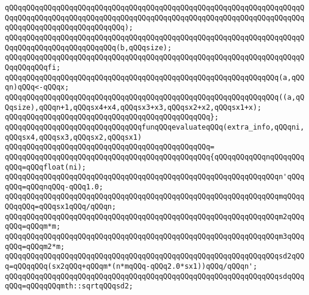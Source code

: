 \verb|qQQqqQQqqQQqqQQqqQQqqQQqqQQqqQQqqQQqqQQqqQQqqQQqqQQqqQQqqQQqqQQqqQQqqQQqqQQqqQQqqQQqqQQqqQQqqQQqqQQqqQQqqQQqqQQqqQQqqQQqqQQqqQQqqQQqqQQqqQQqqQQqqQQqqQQqqQQqqQQqqQQqqQQq);|\newline
\newline
\verb|qQQqqQQqqQQqqQQqqQQqqQQqqQQqqQQqqQQqqQQqqQQqqQQqqQQqqQQqqQQqqQQqqQQqqQQqqQQqqQQqqQQqqQQqqQQqqQQq(b,qQQqsize);|\newline
\verb|qQQqqQQqqQQqqQQqqQQqqQQqqQQqqQQqqQQqqQQqqQQqqQQqqQQqqQQqqQQqqQQqqQQqqQQqqQQqqQQqfi;|\newline
\newline
\verb|qQQqqQQqqQQqqQQqqQQqqQQqqQQqqQQqqQQqqQQqqQQqqQQqqQQqqQQqqQQqqQQq(a,qQQqn)qQQq<-qQQqx;|\newline
\newline
\verb|qQQqqQQqqQQqqQQqqQQqqQQqqQQqqQQqqQQqqQQqqQQqqQQqqQQqqQQqqQQqqQQq((a,qQQqsize),qQQqn+1,qQQqsx4+x4,qQQqsx3+x3,qQQqsx2+x2,qQQqsx1+x);|\newline
\verb|qQQqqQQqqQQqqQQqqQQqqQQqqQQqqQQqqQQqqQQqqQQqqQQq};|\newline
\newline
\verb|qQQqqQQqqQQqqQQqqQQqqQQqqQQqqQQqfunqQQqevaluateqQQq(extra_info,qQQqni,qQQqsx4,qQQqsx3,qQQqsx2,qQQqsx1)|\newline
\verb|qQQqqQQqqQQqqQQqqQQqqQQqqQQqqQQqqQQqqQQqqQQqqQQq=|\newline
\verb|qQQqqQQqqQQqqQQqqQQqqQQqqQQqqQQqqQQqqQQqqQQqqQQq{qQQqqQQqqQQqnqQQqqQQqqQQq=qQQqfloat(ni);|\newline
\verb|qQQqqQQqqQQqqQQqqQQqqQQqqQQqqQQqqQQqqQQqqQQqqQQqqQQqqQQqqQQqqQQqn'qQQqqQQq=qQQqnqQQq-qQQq1.0;|\newline
\newline
\verb|qQQqqQQqqQQqqQQqqQQqqQQqqQQqqQQqqQQqqQQqqQQqqQQqqQQqqQQqqQQqqQQqmqQQqqQQqqQQq=qQQqsx1qQQq/qQQqn;|\newline
\verb|qQQqqQQqqQQqqQQqqQQqqQQqqQQqqQQqqQQqqQQqqQQqqQQqqQQqqQQqqQQqqQQqm2qQQqqQQq=qQQqm*m;|\newline
\verb|qQQqqQQqqQQqqQQqqQQqqQQqqQQqqQQqqQQqqQQqqQQqqQQqqQQqqQQqqQQqqQQqm3qQQqqQQq=qQQqm2*m;|\newline
\newline
\verb|qQQqqQQqqQQqqQQqqQQqqQQqqQQqqQQqqQQqqQQqqQQqqQQqqQQqqQQqqQQqqQQqsd2qQQq=qQQqqQQq(sx2qQQq+qQQqm*(n*mqQQq-qQQq2.0*sx1))qQQq/qQQqn';|\newline
\verb|qQQqqQQqqQQqqQQqqQQqqQQqqQQqqQQqqQQqqQQqqQQqqQQqqQQqqQQqqQQqqQQqsdqQQqqQQq=qQQqqQQqmth::sqrtqQQqsd2;|\newline
\newline
